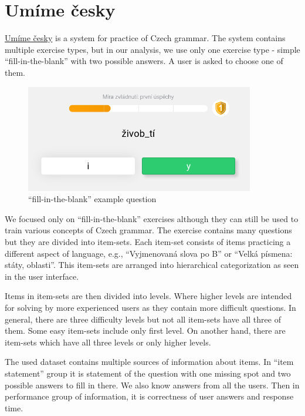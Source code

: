 \documentclass[
  digital, %
  table,   %
  nolof,     %
  nolot,     %
  nocover
]{fithesis3}
\begin{document}
\section{Umíme česky}\label{umime-cesky}


\href{https://umimecesky.cz/}{Umíme česky} is a system for practice of Czech grammar. The system contains multiple exercise types, but in our analysis, we use only one exercise type - simple ``fill-in-the-blank'' with two possible answers. A user is asked to choose one of them.

\begin{figure}
  \begin{center}
    \includegraphics[width=10cm]{img/umimecesky_doplnovacka}
  \end{center}
  \caption{``fill-in-the-blank'' example question}
  \label{fig:umimeceskydoplnovacka}
\end{figure}

We focused only on ``fill-in-the-blank'' exercises although they can still be used to train various concepts of Czech grammar. The exercise contains many questions but they are divided into item-sets. Each item-set consists of items practicing a different aspect of language, e.g., ``Vyjmenovaná slova po B'' or ``Velká písmena: státy, oblasti''. This item-sets are arranged into hierarchical categorization as seen in the user interface.

Items in item-sets are then divided into levels. Where higher levels are intended for solving by more experienced users as they contain more difficult questions. In general, there are three difficulty levels but not all item-sets have all three of them. Some easy item-sets include only first level. On another hand, there are item-sets which have all three levels or only higher levels.


The used dataset contains multiple sources of information about items. In ``item statement'' group it is statement of the question with one missing spot and two possible answers to fill in there. We also know answers from all the users. Then in performance group of information, it is correctness of user answers and response time.
\end{document}
